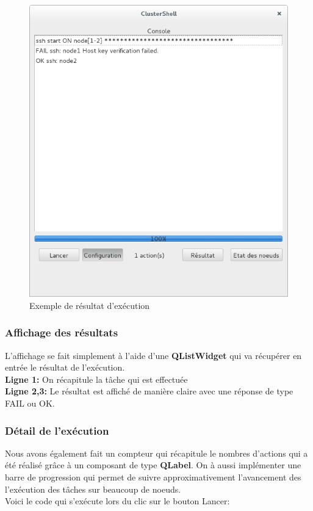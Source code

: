 \documentclass[a4paper,11pt]{article}
\begin{document}
\begin{figure}[H]
\centering
\includegraphics[scale=0.5]{exemple_affichage_console.png}
\caption{Exemple de résultat d'exécution}
\end{figure}
\subsubsection{Affichage des résultats}
\noindent L'affichage se fait simplement à l'aide d'une \textbf{QListWidget} qui va récupérer en entrée le résultat de l'exécution.\\
\textbf{Ligne 1:} On récapitule la tâche qui est effectuée\\
\textbf{Ligne 2,3:} Le résultat est affiché de manière claire avec une réponse de type FAIL ou OK.\\
\linebreak

\subsubsection{Détail de l'exécution}
Nous avons également fait un compteur qui récapitule le nombres d'actions qui a été réalisé grâce à un composant de type \textbf{QLabel}. On à aussi implémenter une barre de progression qui permet de suivre approximativement l'avancement des l'exécution des tâches sur beaucoup de noeuds.\\
Voici le code qui s'exécute lors du clic sur le bouton Lancer:
\end{document}
